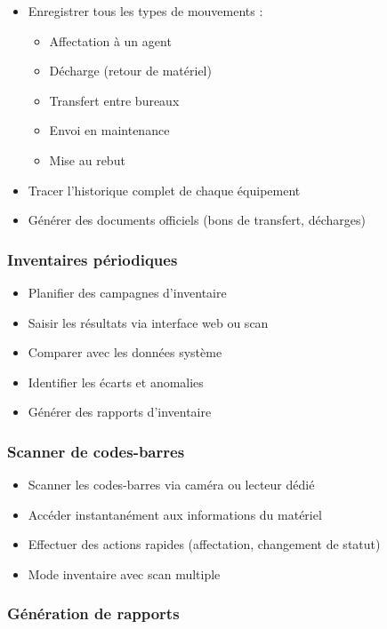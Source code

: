 \documentclass[12pt,a4paper]{report}
\begin{document}
\begin{itemize}
    \item Enregistrer tous les types de mouvements :
    \begin{itemize}
        \item Affectation à un agent
        \item Décharge (retour de matériel)
        \item Transfert entre bureaux
        \item Envoi en maintenance
        \item Mise au rebut
    \end{itemize}
    \item Tracer l'historique complet de chaque équipement
    \item Générer des documents officiels (bons de transfert, décharges)
\end{itemize}

\subsubsection{Inventaires périodiques}

\begin{itemize}
    \item Planifier des campagnes d'inventaire
    \item Saisir les résultats via interface web ou scan
    \item Comparer avec les données système
    \item Identifier les écarts et anomalies
    \item Générer des rapports d'inventaire
\end{itemize}

\subsubsection{Scanner de codes-barres}

\begin{itemize}
    \item Scanner les codes-barres via caméra ou lecteur dédié
    \item Accéder instantanément aux informations du matériel
    \item Effectuer des actions rapides (affectation, changement de statut)
    \item Mode inventaire avec scan multiple
\end{itemize}

\subsubsection{Génération de rapports}
\end{document}
